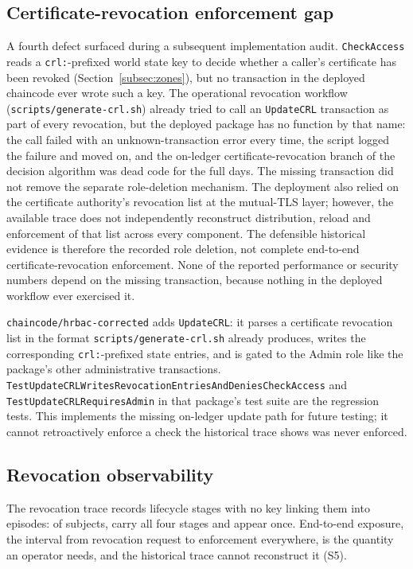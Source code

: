\documentclass[a4paper,fleqn]{cas-sc}
\begin{document}
\subsection{Certificate-revocation enforcement gap}
\label{subsec:pm_crl}

A fourth defect surfaced during a subsequent implementation audit. \texttt{CheckAccess} reads a \texttt{crl:}-prefixed world
state key to decide whether a caller's certificate has been revoked
(Section~\ref{subsec:zones}), but no transaction in the deployed chaincode
ever wrote such a key. The operational revocation workflow
(\texttt{scripts/generate-crl.sh}) already tried to call an
\texttt{UpdateCRL} transaction as part of every revocation, but the
deployed package has no function by that name: the call failed with an
unknown-transaction error every time, the script logged the failure and
moved on, and the on-ledger certificate-revocation branch of the decision
algorithm was dead code for the full \DeployDays{} days. The missing transaction did not remove the separate role-deletion mechanism. The deployment also relied on the certificate authority's revocation list at the mutual-TLS layer; however, the available trace does not independently reconstruct distribution, reload and enforcement of that list across every component. The defensible historical evidence is therefore the recorded role deletion, not complete end-to-end certificate-revocation enforcement. None of the reported performance or
security numbers depend on the missing transaction, because nothing in the
deployed workflow ever exercised it.

\texttt{chaincode/hrbac-corrected} adds \texttt{UpdateCRL}: it parses a
certificate revocation list in the format
\texttt{scripts/generate-crl.sh} already produces, writes the
corresponding \texttt{crl:}-prefixed state entries, and is gated to the
Admin role like the package's other administrative transactions.
\texttt{TestUpdateCRLWrites\-RevocationEntries\-AndDeniesCheckAccess} and
\texttt{TestUpdateCRLRequiresAdmin} in that package's test suite are the
regression tests. This implements the missing on-ledger update path for future testing; it cannot
retroactively enforce a check the historical trace shows was never
enforced.

\subsection{Revocation observability}
\label{subsec:pm_revocation}

The revocation trace records lifecycle stages with no key linking them
into episodes: of \RevSubjects{} subjects, \RevComplete{} carry all four
stages and \RevSingleStage{} appear once. End-to-end exposure, the
interval from revocation request to enforcement everywhere, is the
quantity an operator needs, and the historical trace cannot reconstruct it
(S5).
\end{document}
